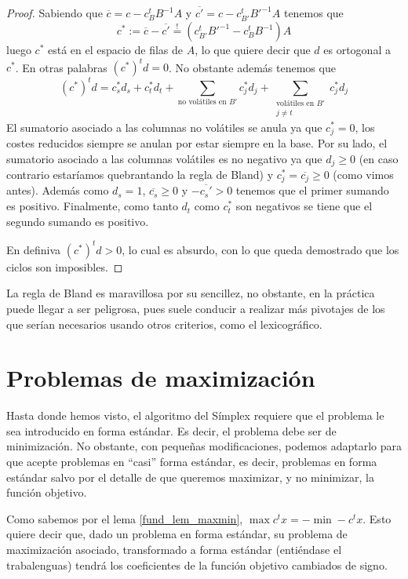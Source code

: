 \begin{proof}
	Sabiendo que $\overline{c}=c-c_B^tB^{-1}A$ y $\overline{c'}=c-c_{B'}^tB'^{-1}A$ tenemos que 
	\begin{equation*}
		c^*:=\overline{c}-\overline{c'}\stackrel{!}{=}(c_{B'}^tB'^{-1}-c_B^tB^{-1})A
	\end{equation*}
	luego $c^*$ está en el espacio de filas de $A$, lo que quiere decir que $d$ es ortogonal a $c^*$. En otras palabras $(c^*)^td=0$. No obstante además tenemos que
	\begin{equation*}
		(c^*)^td=c^*_sd_s+c^*_td_t+\sum_{\text{no volátiles en }B'}c^*_jd_j+\sum_{\substack{\text{volátiles en }B'\\j\not=t}}c^*_jd_j
	\end{equation*}
	El sumatorio asociado a las columnas no volátiles se anula ya que $c_j^*=0$, los costes reducidos siempre se anulan por estar siempre en la base. Por su lado, el sumatorio asociado a las columnas volátiles es no negativo ya que $d_j\geq 0$ (en caso contrario estaríamos quebrantando la regla de Bland) y $c_j^*=\overline{c_j}\geq 0$ (como vimos antes). Además como $d_s=1$, $\overline{c_s}\geq 0$ y $-\overline{c_s'}>0$ tenemos que el primer sumando es positivo. Finalmente, como tanto $d_t$ como $c_t^*$ son negativos se tiene que el segundo sumando es positivo.
	
	En definiva $(c^*)^td>0$, lo cual es absurdo, con lo que queda demostrado que los ciclos son imposibles.
\end{proof}
\begin{obs}[Desventajas]
	La regla de Bland es maravillosa por su sencillez, no obstante, en la práctica puede llegar a ser peligrosa, pues suele conducir a realizar más pivotajes de los que serían necesarios usando otros criterios, como el lexicográfico.
\end{obs}
\section{Problemas de maximización}
Hasta donde hemos visto, el algoritmo del Símplex requiere que el problema le sea introducido en forma estándar. Es decir, el problema debe ser de minimización. No obstante, con pequeñas modificaciones, podemos adaptarlo para que acepte problemas en ``casi'' forma estándar, es decir, problemas en forma estándar salvo por el detalle de que queremos maximizar, y no minimizar, la función objetivo.

Como sabemos por el lema \ref{fund_lem_maxmin}, $\max c^tx=-\min -c^tx$. Esto quiere decir que, dado un problema en forma estándar, su problema de maximización asociado, transformado a forma estándar (entiéndase el trabalenguas) tendrá los coeficientes de la función objetivo cambiados de signo.
